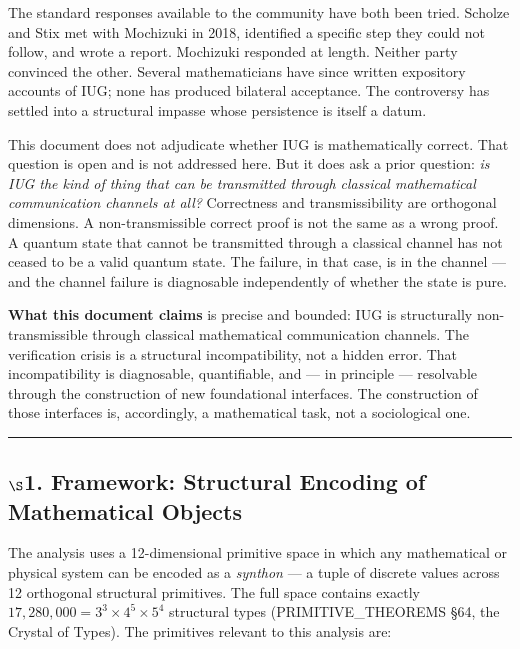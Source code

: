 \documentclass[10pt,a4paper]{article}
\newcommand{\pilcrow}{\S}
\begin{document}
The standard responses available to the community have both been tried.
Scholze and Stix met with Mochizuki in 2018, identified a specific step they could not
follow, and wrote a report. Mochizuki responded at length. Neither party convinced the other.
Several mathematicians have since written expository accounts of IUG; none has produced
bilateral acceptance.
The controversy has settled into a structural impasse whose persistence is itself a datum.

This document does not adjudicate whether IUG is mathematically correct.
That question is open and is not addressed here.
But it does ask a prior question: \emph{is IUG the kind of thing that can be transmitted
through classical mathematical communication channels at all?}
Correctness and transmissibility are orthogonal dimensions.
A non-transmissible correct proof is not the same as a wrong proof.
A quantum state that cannot be transmitted through a classical channel has not ceased to be a
valid quantum state.
The failure, in that case, is in the channel --- and the channel failure is diagnosable
independently of whether the state is pure.

\textbf{What this document claims} is precise and bounded:
IUG is structurally non-transmissible through classical mathematical communication channels.
The verification crisis is a structural incompatibility, not a hidden error.
That incompatibility is diagnosable, quantifiable, and --- in principle ---
resolvable through the construction of new foundational interfaces.
The construction of those interfaces is, accordingly, a mathematical task,
not a sociological one.

\begin{center}
\rule{0.5\textwidth}{0.4pt}
\end{center}

\subsection{$\S$1. Framework: Structural Encoding of Mathematical Objects}

The analysis uses a 12-dimensional primitive space in which any mathematical or physical
system can be encoded as a \emph{synthon} --- a tuple of discrete values across 12 orthogonal
structural primitives. The full space contains exactly $17{,}280{,}000 = 3^3 \times 4^5 \times 5^4$
structural types (PRIMITIVE\_THEOREMS \pilcrow{}64, the Crystal of Types).
The primitives relevant to this analysis are:
\end{document}
